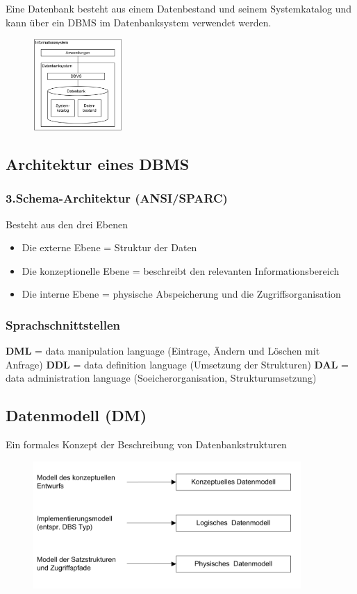 \documentclass[a4paper,10pt]{scrartcl}
\begin{document}
Eine Datenbank besteht aus einem Datenbestand und seinem Systemkatalog und kann über ein DBMS im Datenbanksystem verwendet werden.
\begin{figure}[h]
	\centering
	\includegraphics[width = 0.3\textwidth]{Grundaufbau.PNG}
	\label{img:grafik-dummy}
\end{figure}

\subsection{Architektur eines DBMS}
\subsubsection{3.Schema-Architektur (ANSI/SPARC)}
Besteht aus den drei Ebenen
\begin{itemize}
    \item Die externe Ebene = Struktur der Daten
    \item Die konzeptionelle Ebene = beschreibt den relevanten Informationsbereich
    \item Die interne Ebene = physische Abspeicherung und die Zugriffsorganisation
\end{itemize}

\subsubsection{Sprachschnittstellen}
\textbf{DML} = data manipulation language (Eintrage, Ändern und Löschen mit Anfrage)\newline
\textbf{DDL} = data definition language (Umsetzung der Strukturen)\newline
\textbf{DAL} = data administration language (Soeicherorganisation, Strukturumsetzung)\newline

\subsection{Datenmodell (DM)}
Ein formales Konzept der Beschreibung von Datenbankstrukturen
\begin{figure}[h]
	\centering
	\includegraphics{Datenmodelle.PNG}
	\label{img:grafik-dummy}
\end{figure}
\end{document}
